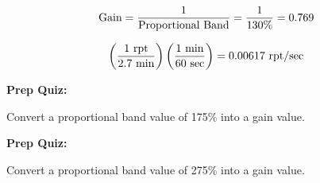 $$\hbox{Gain} = {1 \over \hbox{Proportional Band}} = {1 \over 130\%} = 0.769$$

\vskip 10pt

$$\left(1 \hbox{ rpt} \over 2.7 \hbox{ min}\right) \left(1 \hbox{ min} \over 60 \hbox{ sec}\right) = 0.00617 \hbox{ rpt/sec}$$






\vfil \eject

\noindent
{\bf Prep Quiz:}

Convert a proportional band value of 175\% into a gain value.







\vfil \eject

\noindent
{\bf Prep Quiz:}

Convert a proportional band value of 275\% into a gain value.






